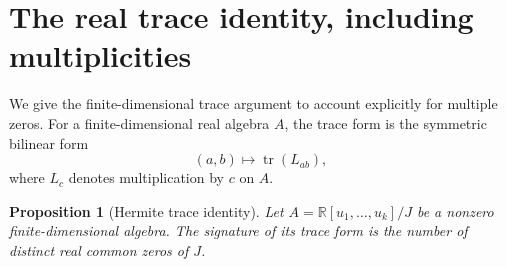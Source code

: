 \documentclass[11pt,leqno]{amsart}
\newtheorem{proposition}[theorem]{Proposition}
\theoremstyle{definition}
\theoremstyle{remark}
\numberwithin{equation}{section}
\newcommand{\R}{\mathbb R}
\newcommand{\tr}{\operatorname{tr}}
\begin{document}
\section{The real trace identity, including multiplicities}\label{sec:trace}

We give the finite-dimensional trace argument to account explicitly for
multiple zeros. For a finite-dimensional real algebra $A$, the trace
form is the symmetric bilinear form
\[
 (a,b)\longmapsto\tr(L_{ab}),
\]
where $L_c$ denotes multiplication by $c$ on $A$.

\begin{proposition}[Hermite trace identity]\label{prop:hermite}
Let $A=\R[u_1,\ldots,u_k]/J$ be a nonzero finite-dimensional algebra.
The signature of its trace form is the number of distinct real common
zeros of $J$.
\end{proposition}
\end{document}
